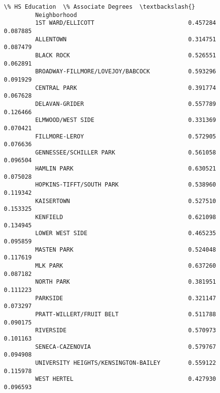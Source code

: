 \documentclass[11pt]{article}
\begin{document}
\begin{Verbatim}[commandchars=\\\{\}]
                                               \% HS Education  \% Associate Degrees  \textbackslash{}
         Neighborhood                                                                
         1ST WARD/ELLICOTT                           0.457284             0.087885   
         ALLENTOWN                                   0.314751             0.087479   
         BLACK ROCK                                  0.526551             0.062891   
         BROADWAY-FILLMORE/LOVEJOY/BABCOCK           0.593296             0.091929   
         CENTRAL PARK                                0.391774             0.067628   
         DELAVAN-GRIDER                              0.557789             0.126466   
         ELMWOOD/WEST SIDE                           0.331369             0.070421   
         FILLMORE-LEROY                              0.572905             0.076636   
         GENNESSEE/SCHILLER PARK                     0.561058             0.096504   
         HAMLIN PARK                                 0.630521             0.075028   
         HOPKINS-TIFFT/SOUTH PARK                    0.538960             0.119342   
         KAISERTOWN                                  0.527510             0.153325   
         KENFIELD                                    0.621098             0.134945   
         LOWER WEST SIDE                             0.465235             0.095859   
         MASTEN PARK                                 0.524048             0.117619   
         MLK PARK                                    0.637260             0.087182   
         NORTH PARK                                  0.381951             0.111223   
         PARKSIDE                                    0.321147             0.073297   
         PRATT-WILLERT/FRUIT BELT                    0.511788             0.090175   
         RIVERSIDE                                   0.570973             0.101163   
         SENECA-CAZENOVIA                            0.579767             0.094908   
         UNIVERSITY HEIGHTS/KENSINGTON-BAILEY        0.559122             0.115978   
         WEST HERTEL                                 0.427930             0.096593   
         

\end{Verbatim}
\end{document}
